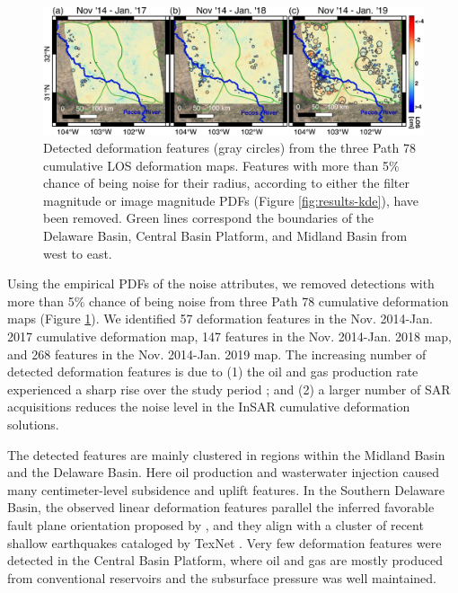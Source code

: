 \begin{figure}
	\centering 
	\includegraphics[width=0.98\linewidth]{figures/chapter6-blobs/figure_results_blobs_path78.pdf}
	\caption{
		Detected deformation features (gray circles) from the three Path 78 cumulative LOS deformation maps. Features with more than 5\% chance of being noise for their radius, according to either the filter magnitude or image magnitude PDFs (Figure \ref{fig:results-kde}), have been removed. Green lines correspond the boundaries of the Delaware Basin, Central Basin Platform, and Midland Basin from west to east.
	}
	\label{fig:results-detections}
\end{figure}


Using the empirical PDFs of the noise attributes, we removed detections with more than 5\% chance of being noise from three Path 78 cumulative deformation maps (Figure \ref{fig:results-detections}). We identified 57 deformation features in the Nov. 2014-Jan. 2017 cumulative deformation map, 147 features in the Nov. 2014-Jan. 2018 map, and 268 features in the Nov. 2014-Jan. 2019 map. The increasing number of detected deformation features is due to (1) the oil and gas production rate experienced a sharp rise over the study period \cite{Staniewicz2020InsarRevealsComplex}; and (2) a larger number of SAR acquisitions reduces the noise level in the InSAR cumulative deformation solutions.



The detected features are mainly clustered in regions within the Midland Basin and the Delaware Basin. Here oil production and wasterwater injection caused many centimeter-level subsidence and uplift features. In the Southern Delaware Basin, the observed linear deformation features parallel the inferred favorable fault plane orientation proposed by \cite{LundSnee2018StateStressPermian}, and they align with a cluster of recent shallow earthquakes cataloged by TexNet \cite{Savvaidis2019TexnetStatewideSeismological}. Very few deformation features were detected in the Central Basin Platform, where oil and gas are mostly produced from conventional reservoirs and the subsurface pressure was well maintained.


